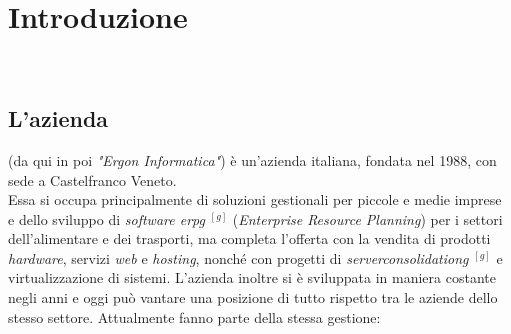 

\chapter{Introduzione}
\label{cap:introduzione}

\noindent {}\\





\section{L'azienda}

\noindent{\myCompany} \cite{site:ergon-informatica}
(da qui in poi
\textit{"Ergon Informatica"}) è un'azienda italiana, fondata nel 1988, 
con sede a Castelfranco Veneto.\\
Essa si occupa principalmente di soluzioni gestionali per piccole e medie imprese e dello sviluppo di
\textit{software \gls{erpg}} $^{[g]}$ (\textit{Enterprise Resource Planning}) per i settori dell'alimentare e dei trasporti,
ma completa l'offerta con la vendita di prodotti
\textit{hardware}, servizi \textit{web} e \textit{hosting}, nonché con progetti di \textit{\gls{serverconsolidationg}} $^{[g]}$ e virtualizzazione di
sistemi.
L'azienda inoltre si è sviluppata in maniera costante negli anni e oggi può vantare una posizione di tutto rispetto tra le aziende dello stesso settore.
Attualmente fanno parte della stessa gestione:


